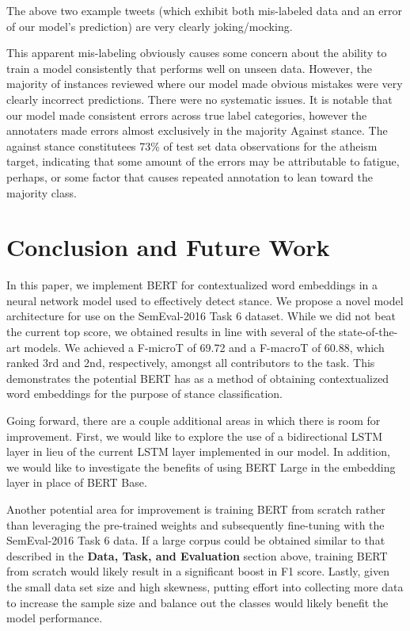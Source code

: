 \documentclass[]{article}
\begin{document}
The above two example tweets (which exhibit both mis-labeled data and an
error of our model's prediction) are very clearly joking/mocking.

This apparent mis-labeling obviously causes some concern about the
ability to train a model consistently that performs well on unseen data.
However, the majority of instances reviewed where our model made obvious
mistakes were very clearly incorrect predictions. There were no
systematic issues. It is notable that our model made consistent errors
across true label categories, however the annotaters made errors almost
exclusively in the majority Against stance. The against stance
constitutees 73\% of test set data observations for the atheism target,
indicating that some amount of the errors may be attributable to
fatigue, perhaps, or some factor that causes repeated annotation to lean
toward the majority class.

\hypertarget{conclusion-and-future-work}{%
\section{Conclusion and Future Work}\label{conclusion-and-future-work}}

In this paper, we implement BERT for contextualized word embeddings in a
neural network model used to effectively detect stance. We propose a
novel model architecture for use on the SemEval-2016 Task 6 dataset.
While we did not beat the current top score, we obtained results in line
with several of the state-of-the-art models. We achieved a F-microT of
69.72 and a F-macroT of 60.88, which ranked 3rd and 2nd, respectively,
amongst all contributors to the task. This demonstrates the potential
BERT has as a method of obtaining contextualized word embeddings for the
purpose of stance classification.

Going forward, there are a couple additional areas in which there is
room for improvement. First, we would like to explore the use of a
bidirectional LSTM layer in lieu of the current LSTM layer implemented
in our model. In addition, we would like to investigate the benefits of
using BERT Large in the embedding layer in place of BERT Base.

Another potential area for improvement is training BERT from scratch
rather than leveraging the pre-trained weights and subsequently
fine-tuning with the SemEval-2016 Task 6 data. If a large corpus could
be obtained similar to that described in the \textbf{Data, Task, and
Evaluation} section above, training BERT from scratch would likely
result in a significant boost in F1 score. Lastly, given the small data
set size and high skewness, putting effort into collecting more data to
increase the sample size and balance out the classes would likely
benefit the model performance.
\end{document}
